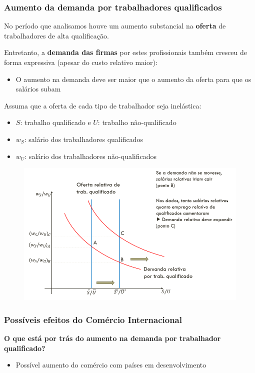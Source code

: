 \documentclass[a4paper,12pt]{article}[abntex2]
\begin{document}
\subsubsection{\textbf{Aumento da demanda por trabalhadores qualificados}}
No período que analisamos houve um aumento substancial na \textbf{oferta} de trabalhadores de alta qualificação.

Entretanto, a \textbf{demanda das firmas} por estes profissionais também cresceu de forma expressiva (apesar do custo relativo maior):
\begin{itemize}
    \item O aumento na demanda deve ser maior que o aumento da oferta para que os salários subam
\end{itemize}

Assuma que a oferta de cada tipo de trabalhador seja inelástica:
\begin{itemize}
    \item $S$: trabalho qualificado e $U$: trabalho não-qualificado
    \item $w_S$: salário dos trabalhadores qualificados
    \item $w_U$: salário dos trabalhadores não-qualificados
\end{itemize}

\begin{figure}[H]
    \centering
    \includegraphics[width=0.7\linewidth]{Imagens/a13i8.png}
\end{figure}

\subsubsection{\textbf{Possíveis efeitos do Comércio Internacional}}
\textbf{O que está por trás do aumento na demanda por trabalhador qualificado?}
\begin{itemize}
    \item Possível aumento do comércio com países em desenvolvimento
\end{itemize}
\end{document}
